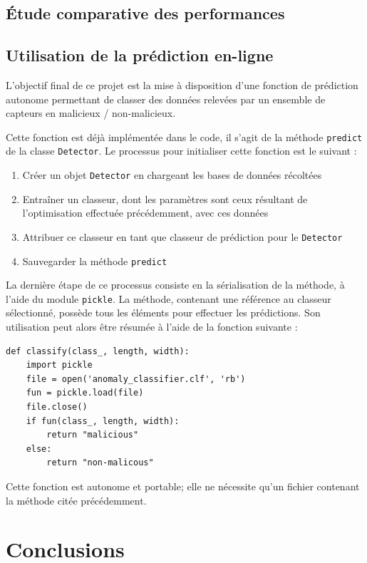 \documentclass[a4paper]{report}
\begin{document}
\section{Étude comparative des performances}

\section{Utilisation de la prédiction en-ligne}

L'objectif final de ce projet est la mise à disposition d'une fonction de prédiction autonome permettant de classer des données relevées par un ensemble de capteurs en malicieux / non-malicieux.

Cette fonction est déjà implémentée dans le code, il s'agit de la méthode \texttt{predict} de la classe \texttt{Detector}. Le processus pour initialiser cette fonction est le suivant :
\begin{enumerate}
\item Créer un objet \texttt{Detector} en chargeant les bases de données récoltées
\item Entraîner un classeur, dont les paramètres sont ceux résultant de l'optimisation effectuée précédemment, avec ces données
\item Attribuer ce classeur en tant que classeur de prédiction pour le \texttt{Detector}
\item Sauvegarder la méthode \texttt{predict}
\end{enumerate}
La dernière étape de ce processus consiste en la sérialisation de la méthode, à l'aide du module \texttt{pickle}. La méthode, contenant une référence au classeur sélectionné, possède tous les éléments pour effectuer les prédictions. Son utilisation peut alors être résumée à l'aide de la fonction suivante :
\begin{verbatim}
def classify(class_, length, width):
    import pickle
    file = open('anomaly_classifier.clf', 'rb')
    fun = pickle.load(file)
    file.close()
    if fun(class_, length, width):
        return "malicious"
    else:
        return "non-malicous"
\end{verbatim}
Cette fonction est autonome et portable; elle ne nécessite qu'un fichier contenant la méthode citée précédemment.

\chapter{Conclusions}
\end{document}
